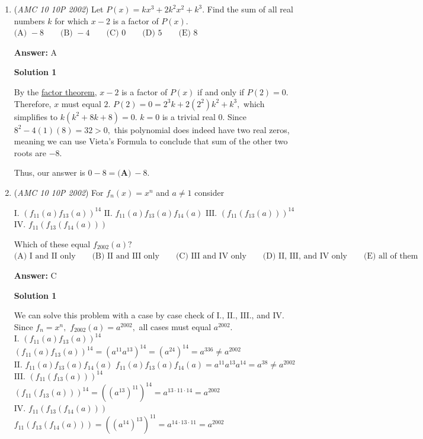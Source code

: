\begin{enumerate}
 


	\item (\textit{AMC 10 10P 2002}) Let $P(x)=kx^3 + 2k^2x^2+k^3.$ Find the sum of all real numbers $k$ for which $x-2$ is a factor of $P(x).$
$\text{(A) }-8 \qquad \text{(B) }-4 \qquad \text{(C) }0 \qquad \text{(D) }5 \qquad \text{(E) }8$

 \textbf{Answer: }A



\textbf{Solution 1}

By the \href{https://artofproblemsolving.com/wiki/index.php?title=Factor\_Theorem}{ factor theorem}, $x-2$ is a factor of $P(x)$ if and only if $P(2)=0.$ Therefore, $x$ must equal $2.$ $P(2)=0=2^3k+2(2^2)k^2+k^3,$ which simplifies to $k(k^2+8k+8)=0.$ $k=0$ is a trivial real $0$. Since $8^2 -4(1)(8)=32 > 0,$ this polynomial does indeed have two real zeros, meaning we can use Vieta’s Formula to conclude that sum of the other two roots are $-8.$ 

 Thus, our answer is $0-8=\boxed{\textbf{(A)}\ -8}.$



	\item (\textit{AMC 10 10P 2002}) For $f_n(x)=x^n$ and $a \neq 1$ consider


 $\text{I. } (f_{11}(a)f_{13}(a))^{14}$
$\text{II. } f_{11}(a)f_{13}(a)f_{14}(a)$
$\text{III. } (f_{11}(f_{13}(a)))^{14}$
$\text{IV. } f_{11}(f_{13}(f_{14}(a)))$


 Which of these equal $f_{2002}(a)?$
$\text{(A) I and II only} \qquad \text{(B) II and III only} \qquad \text{(C) III and IV only} \qquad \text{(D) II, III, and IV only} \qquad \text{(E) all of them}$

 \textbf{Answer: }C



\textbf{Solution 1}

We can solve this problem with a case by case check of $\text{I., II., III.,}$ and $\text{IV.}$ Since $f_n=x^n,$ $f_{2002}(a)=a^{2002},$ all cases must equal $a^{2002}.$
$\text{I. } (f_{11}(a)f_{13}(a))^{14}$
$(f_{11}(a)f_{13}(a))^{14}  =(a^{11}a^{13})^{14}  = (a^{24})^14  = a^{336}  \neq a^{2002}$
$\text{II. } f_{11}(a)f_{13}(a)f_{14}(a)$
$f_{11}(a)f_{13}(a)f_{14}(a) =a^{11}a^{13}a^{14} =a^{38} \neq a^{2002}$
$\text{III. } (f_{11}(f_{13}(a)))^{14}$
$(f_{11}(f_{13}(a)))^{14} =((a^{13})^{11})^{14} =a^{13 \cdot 11 \cdot 14} =a^{2002}$
$\text{IV. } f_{11}(f_{13}(f_{14}(a)))$
$f_{11}(f_{13}(f_{14}(a))) =((a^{14})^{13})^{11} =a^{14 \cdot 13 \cdot 11} =a^{2002}$


\end{enumerate}
